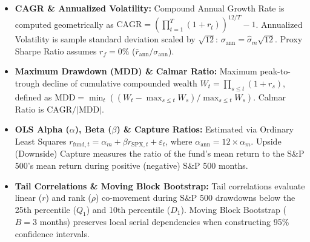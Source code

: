 \documentclass[10pt,a4paper]{article}
\begin{document}
\vspace{0.35em}

\begin{tcolorbox}[colback=cardbg, colframe=cardborder, title=\textbf{\small\strut Appendix B: Quantitative Framework \& Indicator Definitions}, fonttitle=\sffamily\bfseries\small\color{primary}, arc=5pt, boxrule=0.8pt, toptitle=4pt, bottomtitle=4pt, left=6pt, right=6pt, top=4pt, bottom=4pt, colbacktitle=cardborder]
\scriptsize
\begin{itemize}[leftmargin=1.2em, itemsep=1.5pt, topsep=1pt]
    \item \textbf{CAGR \& Annualized Volatility:} Compound Annual Growth Rate is computed geometrically as $\text{CAGR} = \left(\prod_{t=1}^T (1 + r_t)\right)^{12/T} - 1$. Annualized Volatility is sample standard deviation scaled by $\sqrt{12}$: $\sigma_{\text{ann}} = \hat{\sigma}_m \sqrt{12}$. Proxy Sharpe Ratio assumes $r_f = 0\%$ ($\bar{r}_{\text{ann}} / \sigma_{\text{ann}}$).
    \item \textbf{Maximum Drawdown (MDD) \& Calmar Ratio:} Maximum peak-to-trough decline of cumulative compounded wealth $W_t = \prod_{s \le t}(1+r_s)$, defined as $\text{MDD} = \min_t \left((W_t - \max_{s \le t} W_s) / \max_{s \le t} W_s\right)$. Calmar Ratio is $\text{CAGR} / |\text{MDD}|$.
    \item \textbf{OLS Alpha ($\alpha$), Beta ($\beta$) \& Capture Ratios:} Estimated via Ordinary Least Squares $r_{\text{fund},t} = \alpha_m + \beta r_{\text{SPX},t} + \varepsilon_t$, where $\alpha_{\text{ann}} = 12 \times \alpha_m$. Upside (Downside) Capture measures the ratio of the fund's mean return to the S\&P 500's mean return during positive (negative) S\&P 500 months.
    \item \textbf{Tail Correlations \& Moving Block Bootstrap:} Tail correlations evaluate linear ($r$) and rank ($\rho$) co-movement during S\&P 500 drawdowns below the 25th percentile ($Q_1$) and 10th percentile ($D_1$). Moving Block Bootstrap ($B=3$ months) preserves local serial dependencies when constructing 95\% confidence intervals.
\end{itemize}
\end{tcolorbox}

\vspace{0.35em}
\end{document}
